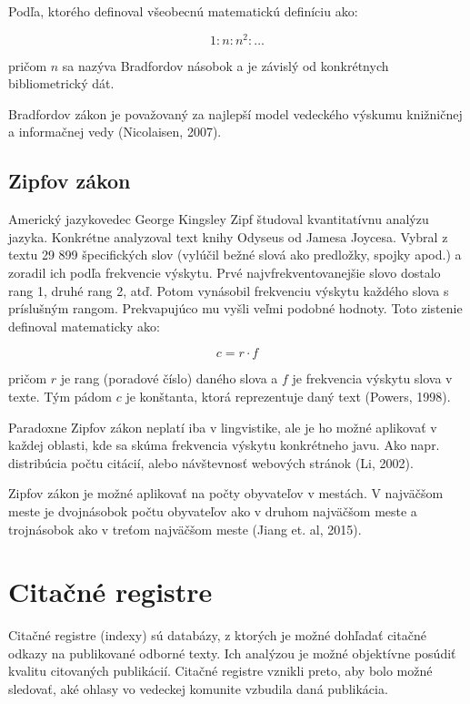 Podľa, ktorého definoval všeobecnú matematickú definíciu ako:

\begin{equation}
\label{eq:bradfordov_zakon4}
1 : n : n^2 : \dotso
\end{equation}

pričom $n$ sa nazýva Bradfordov násobok a je závislý od konkrétnych
bibliometrický dát.

Bradfordov zákon je považovaný za najlepší model vedeckého výskumu knižničnej a
informačnej vedy (Nicolaisen, 2007).


\subsection{Zipfov zákon}

Americký jazykovedec George Kingsley Zipf študoval kvantitatívnu analýzu jazyka.
Konkrétne analyzoval text knihy Odyseus od Jamesa Joycesa.  Vybral z textu 29
899 špecifických slov (vylúčil bežné slová ako predložky, spojky apod.)  a
zoradil ich podľa frekvencie výskytu.  Prvé najvfrekventovanejšie slovo dostalo
rang 1, druhé rang 2, atď.  Potom vynásobil frekvenciu výskytu každého slova s
príslušným rangom.  Prekvapujúco mu vyšli veľmi podobné hodnoty.  Toto zistenie
definoval matematicky ako:

\begin{equation}
\label{eq:zipfov_zakon}
c = r \cdot f
\end{equation}

pričom $r$ je rang (poradové číslo) daného slova a $f$ je frekvencia výskytu
slova v texte.  Tým pádom $c$ je konštanta, ktorá reprezentuje daný text
(Powers, 1998).


Paradoxne Zipfov zákon neplatí iba v lingvistike, ale je ho možné aplikovať v
každej oblasti, kde sa skúma frekvencia výskytu konkrétneho javu.  Ako
napr.\,distribúcia počtu citácií, alebo návštevnosť webových stránok (Li, 2002).

Zipfov zákon je možné aplikovať na počty obyvateľov v mestách.  V najväčšom
meste je dvojnásobok počtu obyvateľov ako v druhom najväčšom meste a trojnásobok
ako v treťom najväčšom meste (Jiang et. al, 2015).


\section{Citačné registre}

Citačné registre (indexy) sú databázy, z ktorých je možné dohľadať citačné
odkazy na publikované odborné texty.  Ich analýzou je možné objektívne posúdiť
kvalitu citovaných publikácií.  Citačné registre vznikli preto, aby bolo možné
sledovať, aké ohlasy vo vedeckej komunite vzbudila daná publikácia.


